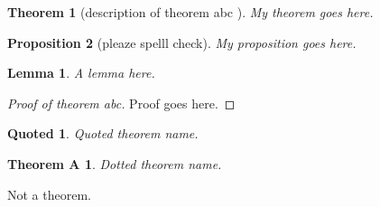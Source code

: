 \documentclass{article}
\theoremstyle{plain}
\newtheorem{thm}{Theorem}[section]
\newtheorem{prp}[thm]{Proposition}
\newtheorem{lemma}{Lemma}
\newtheorem{"quoted"}{Quoted}
\newtheorem{thm.a}{Theorem A}
\begin{document}
\begin{thm}[description of theorem abc \cite{abc}]
  My theorem goes here.
\end{thm}

\begin{prp}[pleaze spelll check]
  My proposition goes here.
\end{prp}

\begin{lemma}
  A lemma here.
\end{lemma}

\begin{proof}[Proof of theorem abc]
    Proof goes here.
\end{proof}

\begin{"quoted"}
  Quoted theorem name.
\end{"quoted"}

\begin{thm.a}
  Dotted theorem name.
\end{thm.a}

\begin{thmXa}
  Not a theorem.
\end{thmXa}
\end{document}
